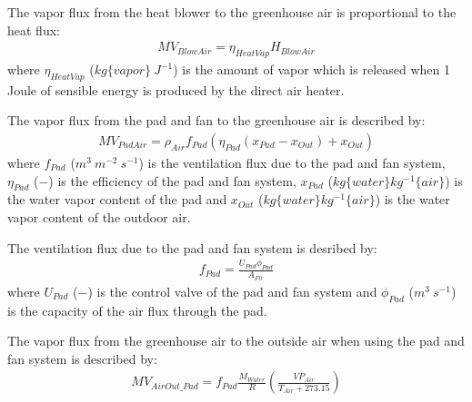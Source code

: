\documentclass[a4paper]{article}
\numberwithin{equation}{section}
\begin{document}
The vapor flux from the heat blower to the greenhouse air is proportional to the heat flux:
\begin{align}
  MV_{BlowAir} = \eta_{HeatVap} H_{BlowAir}
\end{align}
where \(\eta_{HeatVap}\) (\(kg\{vapor\}\ J^{-1}\)) is the amount of vapor which is released when 1 Joule of sensible energy is produced by the direct air heater.

The vapor flux from the pad and fan to the greenhouse air is described by:
\begin{align}
  MV_{PadAir} = \rho_{Air} f_{Pad} (\eta_{Pad} (x_{Pad} - x_{Out}) + x_{Out})
\end{align}
where \(f_{Pad}\) (\(m^3\ m^{-2}\ s^{-1}\)) is the ventilation flux due to the pad and fan system, \(\eta_{Pad}\) (\(-\)) is the efficiency of the pad and fan system, \(x_{Pad}\) (\(kg\{water\} kg^{-1}\{air\}\)) is the water vapor content of the pad and \(x_{Out}\) (\(kg\{water\} kg^{-1}\{air\}\)) is the water vapor content of the outdoor air.

The ventilation flux due to the pad and fan system is desribed by:
\begin{align}
  f_{Pad} = \frac{U_{Pad} \phi_{Pad}}{A_{Flr}}
\end{align}
where \(U_{Pad}\) (\(-\)) is the control valve of the pad and fan system and \(\phi_{Pad}\) (\(m^3\ s^{-1}\)) is the capacity of the air flux through the pad.

The vapor flux from the greenhouse air to the outside air when using the pad and fan system is described by:
\begin{align}
  MV_{AirOut\_Pad} = f_{Pad} \frac{M_{Water}}{R} \left(\frac{VP_{Air}}{T_{Air} + 273.15}\right)
\end{align}
\end{document}
